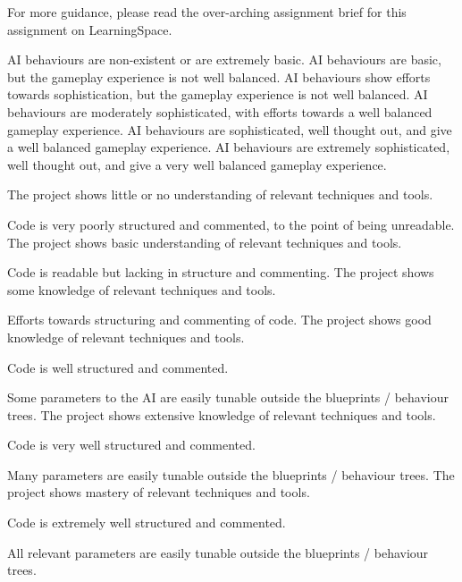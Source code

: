 \documentclass{../../../fal_assignment}
\begin{document}
For more guidance, please read the over-arching assignment brief for this assignment on LearningSpace.

\begin{markingrubric}
        \grade\fail AI behaviours are non-existent or are extremely basic.
		\grade AI behaviours are basic, but the gameplay experience is not well balanced.
		\grade AI behaviours show efforts towards sophistication, but the gameplay experience is not well balanced.
		\grade AI behaviours are moderately sophisticated, with efforts towards a well balanced gameplay experience.
		\grade AI behaviours are sophisticated, well thought out, and give a well balanced gameplay experience.
		\grade AI behaviours are extremely sophisticated, well thought out, and give a very well balanced gameplay experience.

        \grade \fail The project shows little or no understanding of relevant techniques and tools.
			\par Code is very poorly structured and commented, to the point of being unreadable.
        \grade The project shows basic understanding of relevant techniques and tools.
			\par Code is readable but lacking in structure and commenting.
        \grade The project shows some knowledge of relevant techniques and tools.
			\par Efforts towards structuring and commenting of code.
        \grade The project shows good knowledge of relevant techniques and tools.
			\par Code is well structured and commented.
			\par Some parameters to the AI are easily tunable outside the blueprints / behaviour trees.
        \grade The project shows extensive knowledge of relevant techniques and tools.
			\par Code is very well structured and commented.
			\par Many parameters are easily tunable outside the blueprints / behaviour trees.
        \grade The project shows mastery of relevant techniques and tools.
			\par Code is extremely well structured and commented.
			\par All relevant parameters are easily tunable outside the blueprints / behaviour trees.
\end{markingrubric}
\end{document}
